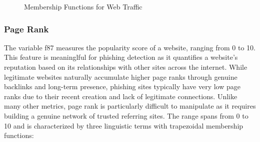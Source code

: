 \documentclass{article}
\begin{document}
\begin{figure}[H]
\centering
{}
\caption{Membership Functions for Web Traffic}
\label{fig:membership_web_traffic}
\end{figure}

\subsubsection{Page Rank}

The variable f87 measures the popularity score of a website, ranging from 0 to 10. This feature is meaninglful for phishing detection as it quantifies a website's reputation based on its relationships with other sites across the internet. While legitimate websites naturally accumulate higher page ranks through genuine backlinks and long-term presence, phishing sites typically have very low page ranks due to their recent creation and lack of legitimate connections. Unlike many other metrics, page rank is particularly difficult to manipulate as it requires building a genuine network of trusted referring sites. The range spans from 0 to 10 and is characterized by three linguistic terms with trapezoidal membership functions:
\end{document}
